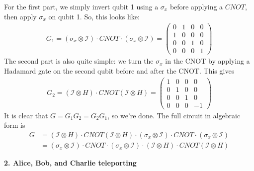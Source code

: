 \documentclass{article}
\theoremstyle{definition}
\newcommand{\Id}{\mathcal{I}}
\begin{document}
\begin{enumerate}[label=(\alph*)]
	For the first part, we simply invert qubit 1 using a $\sigma_x$ before applying a $CNOT$, then apply $\sigma_x$ on qubit 1. So, this looks like:
	\begin{align*}
		G_1 = (\sigma_x \otimes \Id) \cdot CNOT \cdot (\sigma_x \otimes \Id) = \begin{pmatrix}
			0&1&0&0\\
			1&0&0&0\\
			0&0&1&0\\
			0&0&0&1
		\end{pmatrix}
	\end{align*}
	The second part is also quite simple: we turn the $\sigma_x$ in the CNOT by applying a Hadamard gate on the second qubit before and after the CNOT. This gives
	\begin{align*}
		G_2 = (\Id \otimes H) \cdot CNOT (\Id \otimes H) = \begin{pmatrix}
			1&0&0&0\\
			0&1&0&0\\
			0&0&1&0\\
			0&0&0&-1
		\end{pmatrix}
	\end{align*}
	It is clear that $G = G_1 G_2 = G_2 G_1$, so we're done. The full circuit in algebraic form is 
	\begin{align*}
		G &= (\Id \otimes H) \cdot CNOT (\Id \otimes H) \cdot (\sigma_x \otimes \Id) \cdot CNOT \cdot (\sigma_x \otimes \Id) \\
		&= (\sigma_x \otimes \Id) \cdot CNOT \cdot (\sigma_x \otimes \Id) \cdot (\Id \otimes H) \cdot CNOT (\Id \otimes H)
	\end{align*}
	
\end{enumerate}



\noindent \textbf{2. Alice, Bob, and Charlie teleporting}\\
\end{document}
